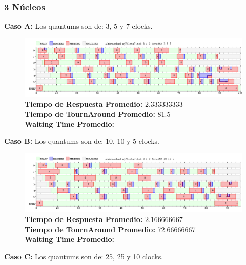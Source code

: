\documentclass[a4paper]{article}
\begin{document}
 \newpage
	\subsubsection*{3 N\'ucleos}
	
	\textbf{Caso A:} Los quantums son de: 3, 5 y 7 clocks.

		 \begin{figure}[h!]
   \begin{center}
 	\includegraphics[scale=0.5]{imagenes/ej7/3nucleoA.png}
 	\textbf{Tiempo de Respuesta Promedio:} 2.333333333 \\
 	\textbf{Tiempo de TournAround Promedio:} 81.5 \\
 	\textbf{Waiting Time Promedio:} \\
   \end{center}
 \end{figure} 
 	
	\textbf{Caso B:}  Los quantums son de: 10, 10 y 5 clocks.

		 \begin{figure}[h!]
   \begin{center}
 	\includegraphics[scale=0.5]{imagenes/ej7/3nucleoB.png}
 	\textbf{Tiempo de Respuesta Promedio:} 2.166666667 \\
 	\textbf{Tiempo de TournAround Promedio:} 72.66666667 \\
 	\textbf{Waiting Time Promedio:} \\
   \end{center}
 \end{figure} 
 	
	\textbf{Caso C:}  Los quantums son de: 25, 25 y 10 clocks.
\end{document}
